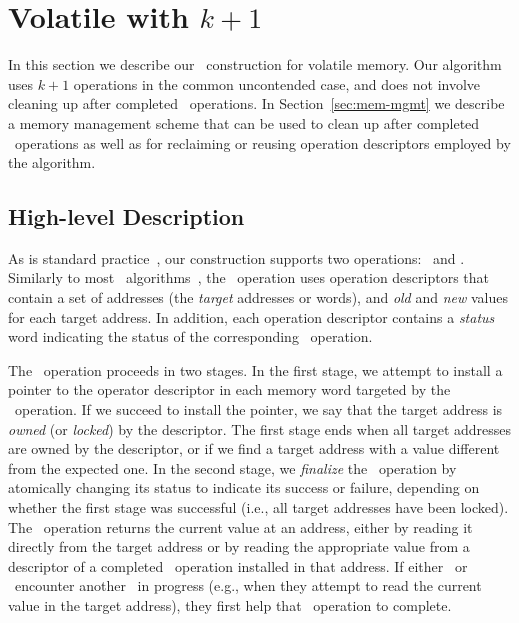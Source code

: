 
\section{Volatile \mcas{} with \texorpdfstring{$k+1$}{k+1} \cas{}}
\label{sec:algos}

In this section we describe our \mcas\ construction for volatile memory.
Our algorithm uses $k+1$ \cas{} operations in the common uncontended case, and does not involve cleaning up after completed \mcas\ operations.
In Section~\ref{sec:mem-mgmt} we describe a memory management scheme that can
be used to clean up after completed \mcas\ operations as well as for reclaiming or reusing
operation descriptors employed by the algorithm.

\subsection{High-level Description}

As is standard practice~\cite{ha04, harris02, sundell11}, our \mcas{} construction supports two operations: \mcas\ and \ttread. 
Similarly to most \mcas\ algorithms~\cite{ha04, harris02, sundell11}, the \mcas\ operation uses operation descriptors that contain
a set of addresses (the \emph{target} addresses or words), and \emph{old} and \emph{new} values for each target address.
In addition, each operation descriptor contains a \emph{status} word indicating the status of the corresponding \mcas\ operation.

The \mcas\ operation proceeds in two stages. 
In the first stage, we attempt to install a pointer to the operator descriptor in each memory word 
targeted by the \mcas\ operation.
If we succeed to install the pointer, we say that the target address is \emph{owned} (or \emph{locked}) by the descriptor.
The first stage ends when all target addresses are owned by the descriptor, or if we find
a target address with a value different from the expected one.
In the second stage, we \emph{finalize} the \mcas\ operation by atomically changing its status 
to indicate its success or failure, depending on whether the first stage was successful (i.e., all target addresses have been locked).
The \ttread\ operation returns the current value at an address, either by reading it directly from the target address 
or by reading the appropriate value from a descriptor of a completed \mcas\ operation installed in that address.
If either \mcas\ or \ttread\ encounter another \mcas\ in progress (e.g., when they attempt to
read the current value in the target address), they first help that \mcas\ operation to complete.

